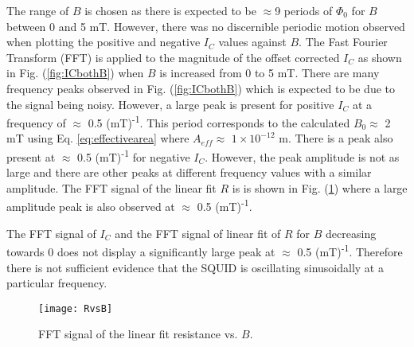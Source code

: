 The range of $B$ is chosen as there is expected to be $\approx$9 periods of $\Phi _0$ for $B$ between 0 and 5 mT. However, there was no discernible periodic motion observed when plotting the positive and negative $I_C$ values against $B$. The Fast Fourier Transform (FFT) is applied to the magnitude of the offset corrected $I_C$ as shown in Fig. (\ref{fig:ICbothB}) when $B$ is increased from 0 to 5 mT. There are many frequency peaks observed in Fig. (\ref{fig:ICbothB}) which is expected to be due to the signal being noisy. However, a large peak is present for positive $I_C$ at a frequency of $\approx$ 0.5 (mT)\textsuperscript{-1}. This period corresponds to the calculated $B_0\approx$ 2 mT using Eq. \ref{eq:effectivearea} where $A_{eff}\approx$ $1 \times {10^{ - 12}}$ m. There is a peak also present at $\approx$ 0.5 (mT)\textsuperscript{-1} for negative $I_C$. However, the peak amplitude is not as large and there are other peaks at different frequency values with a similar amplitude. The FFT signal of the linear fit $R$ is is shown in Fig. (\ref{fig:RvsB}) where a large amplitude peak is also observed at $\approx$ 0.5 (mT)\textsuperscript{-1}. 

The FFT signal of $I_C$ and the FFT signal of linear fit of $R$ for $B$ decreasing towards 0 does not display a significantly large peak at $\approx$ 0.5 (mT)\textsuperscript{-1}. Therefore there is not sufficient evidence that the SQUID is oscillating sinusoidally at a particular frequency.

\begin{figure}[t]
\centering
\texttt{[image: RvsB]}
\caption{\label{fig:RvsB}FFT signal of the linear fit resistance vs. $B$.}
\end{figure}

